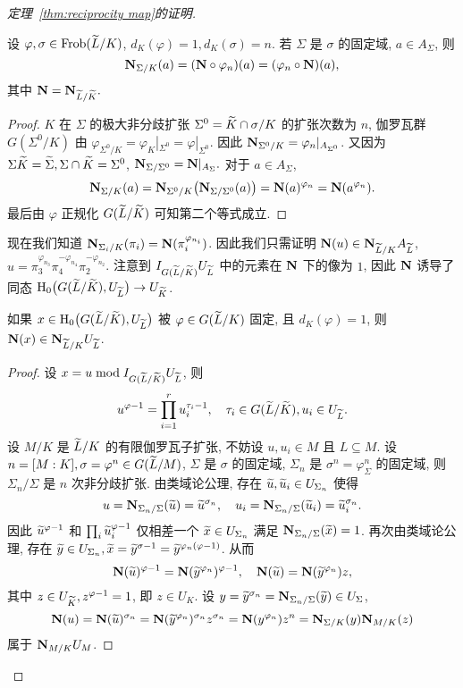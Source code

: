 \begin{proof}[定理~\ref{thm:reciprocity map}的证明]
\begin{lemma}{}{}
设 $\varphi,\sigma\in{\mathrm{Frob}}(\widetilde L/K)$, $d_K(\varphi)=1,d_K(\sigma)=n$. 若 $\Sigma$ 是 $\sigma$ 的固定域, $a\in A_{\Sigma}$, 则
  \[{\mathbf{N}}_{\Sigma/K}(a)=({\mathbf{N}}\circ \varphi_n)(a)=(\varphi_n\circ {\mathbf{N}})(a),\]
其中 ${\mathbf{N}}={\mathbf{N}}_{\widetilde L/\widetilde K}.$
\end{lemma}
\begin{proof}
$K$ 在 $\Sigma$ 的极大非分歧扩张 $\Sigma^0=\widetilde K\cap \sigma/K$ 的扩张次数为 $n$, 伽罗瓦群 $G(\Sigma^0/K)$ 由 $\varphi_{\Sigma^0/K}=\varphi_K|_{\Sigma^0}=\varphi|_{\Sigma^0}.$ 因此 ${\mathbf{N}}_{\Sigma^0/K}=\varphi_n|_{A_{\Sigma^0}}$. 又因为 $\Sigma \widetilde K=\widetilde \Sigma,\Sigma\cap \widetilde K=\Sigma^0$, ${\mathbf{N}}_{\Sigma/\Sigma^0}={\mathbf{N}}|_{A_\Sigma}.$ 对于 $a\in A_{\Sigma}$, 
  \[{\mathbf{N}}_{\Sigma/K}(a)={\mathbf{N}}_{\Sigma^0/K}\bigl({\mathbf{N}}_{\Sigma/\Sigma^0}(a)\bigr)={\mathbf{N}}(a)^{\varphi_n}={\mathbf{N}}(a^{\varphi_n}).\]
最后由 $\varphi$ 正规化 $G(\widetilde L/\widetilde K)$ 可知第二个等式成立.
\end{proof}

现在我们知道 ${\mathbf{N}}_{\Sigma_i/K}(\pi_i)={\mathbf{N}}(\pi_i^{\varphi_{n_i}})$. 因此我们只需证明 ${\mathbf{N}}(u)\in{\mathbf{N}}_{\widetilde L/K}A_{\widetilde L}$, $u=\pi_3^{\varphi_{n_3}}\pi_4^{-\varphi_{n_4}}\pi_2^{-\varphi_{n_2}}$.
注意到 $I_{G(\widetilde L/\widetilde K)}U_{\widetilde L}$ 中的元素在 ${\mathbf{N}}$ 下的像为 $1$, 因此 ${\mathbf{N}}$ 诱导了同态 ${\mathrm{H}}_0\bigl(G(\widetilde L/\widetilde K),U_{\widetilde L}\bigr)\to U_{\widetilde K}$.

\begin{lemma}{}{}
如果 $x\in {\mathrm{H}}_0\bigl(G(\widetilde L/\widetilde K),U_{\widetilde L}\bigr)$ 被 $\varphi\in G(\widetilde L/K)$ 固定, 且 $d_K(\varphi)=1$, 则 ${\mathbf{N}}(x)\in{\mathbf{N}}_{\widetilde L/K}U_{\widetilde L}$.
\end{lemma}
\begin{proof}
设 $x=u\bmod I_{G(\widetilde L/\widetilde K)}U_{\widetilde L}$, 则
  \[u^{\varphi-1}=\prod_{i=1}^r u_i^{\tau_i-1}, \quad \tau_i\in G(\widetilde L/\widetilde K),u_i\in U_{\widetilde L}.\]
设 $M/K$ 是 $\widetilde L/K$ 的有限伽罗瓦子扩张, 不妨设 $u,u_i\in M$ 且 $L\subseteq M$. 设 $n=[M:K],\sigma=\varphi^n\in G(\widetilde L/M)$, $\Sigma$ 是 $\sigma$ 的固定域, $\Sigma_n$ 是 $\sigma^n=\varphi_\Sigma^n$ 的固定域, 则 $\Sigma_n/\Sigma$ 是 $n$ 次非分歧扩张. 由类域论公理, 存在 $\widetilde u,\widetilde u_i\in U_{\Sigma_n}$ 使得
  \[u={\mathbf{N}}_{\Sigma_n/\Sigma}(\widetilde u)=\widetilde u^{\sigma_n},\quad
u_i={\mathbf{N}}_{\Sigma_n/\Sigma}(\widetilde u_i)=\widetilde u_i^{\sigma_n}.\]
因此 $\widetilde u^{\varphi-1}$ 和 $\prod_i \widetilde u_i^{\varphi-1}$ 仅相差一个 $\widetilde x\in U_{\Sigma_n}$ 满足 ${\mathbf{N}}_{\Sigma_n/\Sigma}(\widetilde x)=1$. 再次由类域论公理, 存在 $\widetilde y\in U_{\Sigma_n},\widetilde x=\widetilde y^{\sigma-1}=\widetilde y^{\varphi_n(\varphi -1)}$. 从而
  \[{\mathbf{N}}(\widetilde u)^{\varphi -1}={\mathbf{N}}(\widetilde y^{\varphi_n})^{\varphi-1},\quad
{\mathbf{N}}(\widetilde u)={\mathbf{N}}(\widetilde y^{\varphi_n})z,\]
其中 $z\in U_{\widetilde K},z^{\varphi-1}=1$, 即 $z\in U_K$. 设 $y=\widetilde y^{\sigma_n}={\mathbf{N}}_{\Sigma_n/\Sigma}(\widetilde y)\in U_\Sigma$,
  \[{\mathbf{N}}(u)={\mathbf{N}}(\widetilde u)^{\sigma_n}={\mathbf{N}}(\widetilde y^{\varphi_n})^{\sigma_n}z^{\sigma_n}={\mathbf{N}}(y^{\varphi_n})z^n={\mathbf{N}}_{\Sigma/K}(y){\mathbf{N}}_{M/K}(z)\]
属于 ${\mathbf{N}}_{M/K}U_M$.
\end{proof}


\end{proof}
